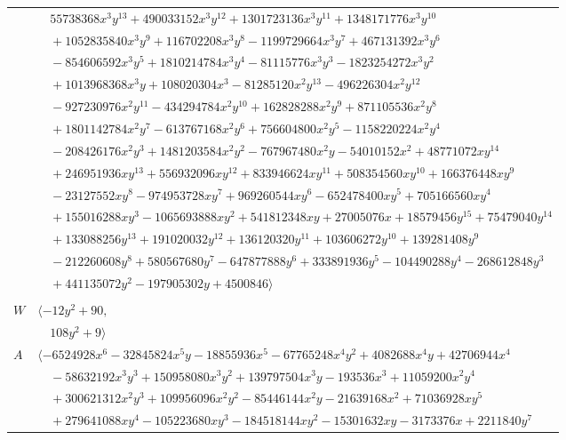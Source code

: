 \documentclass[11pt]{article}
\begin{document}
\begin{longtable}{@{}ll@{}}
 & $\quad 55738368x^{3}y^{13}+490033152x^{3}y^{12}+1301723136x^{3}y^{11}+1348171776x^{3}y^{10}$\\
 & $\quad +1052835840x^{3}y^{9}+116702208x^{3}y^{8}-1199729664x^{3}y^{7}+467131392x^{3}y^{6}$\\
 & $\quad -854606592x^{3}y^{5}+1810214784x^{3}y^{4}-81115776x^{3}y^{3}-1823254272x^{3}y^{2}$\\
 & $\quad +1013968368x^{3}y+108020304x^{3}-81285120x^{2}y^{13}-496226304x^{2}y^{12}$\\
 & $\quad -927230976x^{2}y^{11}-434294784x^{2}y^{10}+162828288x^{2}y^{9}+871105536x^{2}y^{8}$\\
 & $\quad +1801142784x^{2}y^{7}-613767168x^{2}y^{6}+756604800x^{2}y^{5}-1158220224x^{2}y^{4}$\\
 & $\quad -208426176x^{2}y^{3}+1481203584x^{2}y^{2}-767967480x^{2}y-54010152x^{2}+48771072xy^{14}$\\
 & $\quad +246951936xy^{13}+556932096xy^{12}+833946624xy^{11}+508354560xy^{10}+166376448xy^{9}$\\
 & $\quad -23127552xy^{8}-974953728xy^{7}+969260544xy^{6}-652478400xy^{5}+705166560xy^{4}$\\
 & $\quad +155016288xy^{3}-1065693888xy^{2}+541812348xy+27005076x+18579456y^{15}+75479040y^{14}$\\
 & $\quad +133088256y^{13}+191020032y^{12}+136120320y^{11}+103606272y^{10}+139281408y^{9}$\\
 & $\quad -212260608y^{8}+580567680y^{7}-647877888y^{6}+333891936y^{5}-104490288y^{4}-268612848y^{3}$\\
 & $\quad +441135072y^{2}-197905302y+4500846\rangle$\\
\addlinespace[2pt]
\multicolumn{2}{@{}p{0.97\textwidth}@{}}{$i=9$, $D_i=24$, $\rho_{ij}$: $17{:}1, \allowbreak 19{:}2, \allowbreak 23{:}2, \allowbreak 27{:}2, \allowbreak 32{:}1, \allowbreak 34{:}1, \allowbreak 36{:}1$}\\
$W$ & $\langle -12y^{2}+90,$\\
 & $\quad 108y^{2}+9\rangle$\\
$A$ & $\langle -6524928x^{6}-32845824x^{5}y-18855936x^{5}-67765248x^{4}y^{2}+4082688x^{4}y+42706944x^{4}$\\
 & $\quad -58632192x^{3}y^{3}+150958080x^{3}y^{2}+139797504x^{3}y-193536x^{3}+11059200x^{2}y^{4}$\\
 & $\quad +300621312x^{2}y^{3}+109956096x^{2}y^{2}-85446144x^{2}y-21639168x^{2}+71036928xy^{5}$\\
 & $\quad +279641088xy^{4}-105223680xy^{3}-184518144xy^{2}-15301632xy-3173376x+2211840y^{7}$\\

\end{longtable}
\end{document}
